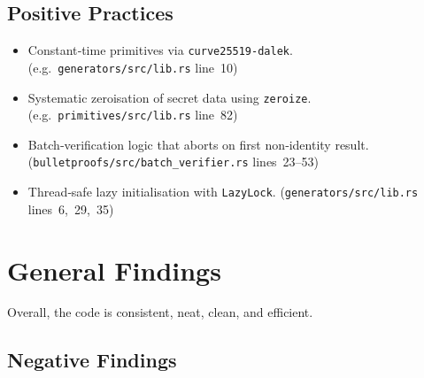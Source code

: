 \documentclass[12pt,a4paper]{article}
\begin{document}
\subsection*{Positive Practices}

\begin{itemize}
  \item Constant‑time primitives via \texttt{curve25519‑dalek}.
        (e.g.\ \texttt{generators/src/lib.rs} line~10)
  \item Systematic zeroisation of secret data using \texttt{zeroize}.
        (e.g.\ \texttt{primitives/src/lib.rs} line~82)
  \item Batch‑verification logic that aborts on first non‑identity result.  \\
        (\texttt{bulletproofs/src/batch\_verifier.rs} lines~23--53)
  \item Thread‑safe lazy initialisation with \texttt{LazyLock}.
        (\texttt{generators/src/lib.rs} \\lines~6,~29,~35)
\end{itemize}



\section{General Findings}

Overall, the code is consistent, neat, clean, and efficient.

\subsection{Negative Findings}
\end{document}
